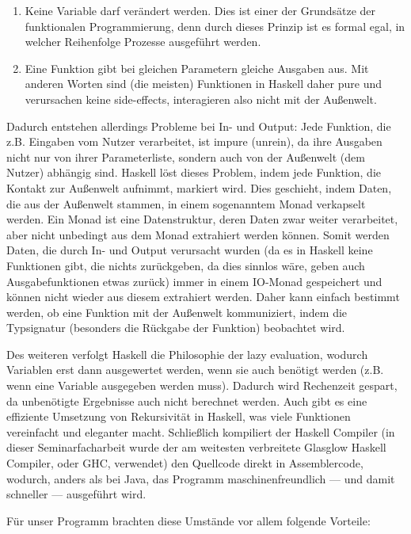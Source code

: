 \documentclass[twoside,a4paper,draft]{article}
\begin{document}
\begin{enumerate}
\item Keine Variable darf verändert werden. Dies ist einer der Grundsätze der funktionalen Programmierung, denn durch dieses Prinzip ist es formal egal, in welcher Reihenfolge Prozesse ausgeführt werden.
\item Eine Funktion gibt bei gleichen Parametern gleiche Ausgaben aus. Mit anderen Worten sind (die meisten) Funktionen in Haskell daher \glqq{}pure\grqq{} und verursachen keine \glqq{}side-effects\grqq{}, interagieren also nicht mit der Außenwelt.
\end{enumerate}

Dadurch entstehen allerdings Probleme bei In- und Output: Jede Funktion, die z.B. Eingaben vom Nutzer verarbeitet, ist \glqq{}impure\grqq{} (unrein), da ihre Ausgaben nicht nur von ihrer Parameterliste, sondern auch von der Außenwelt (dem Nutzer) abhängig sind. Haskell löst dieses Problem, indem jede Funktion, die Kontakt zur Außenwelt aufnimmt, markiert wird. Dies geschieht, indem Daten, die aus der Außenwelt stammen, in einem sogenanntem \glqq{}Monad\grqq{} verkapselt werden. Ein Monad ist eine Datenstruktur, deren Daten zwar weiter verarbeitet, aber nicht unbedingt aus dem Monad extrahiert werden können. Somit werden Daten, die durch In- und Output verursacht wurden (da es in Haskell keine Funktionen gibt, die nichts zurückgeben, da dies sinnlos wäre, geben auch Ausgabefunktionen etwas zurück) immer in einem \glqq{}IO-Monad\grqq{} gespeichert und können nicht wieder aus diesem extrahiert werden. Daher kann einfach bestimmt werden, ob eine Funktion mit der Außenwelt kommuniziert, indem die Typsignatur (besonders die Rückgabe der Funktion) beobachtet wird.

Des weiteren verfolgt Haskell die Philosophie der \glqq{}lazy evaluation\grqq{}, wodurch Variablen erst dann ausgewertet werden, wenn sie auch benötigt werden (z.B. wenn eine Variable ausgegeben werden muss). Dadurch wird Rechenzeit gespart, da unbenötigte Ergebnisse auch nicht berechnet werden. Auch gibt es eine effiziente Umsetzung von Rekursivität in Haskell, was viele Funktionen vereinfacht und eleganter macht. Schließlich kompiliert der Haskell Compiler (in dieser Seminarfacharbeit wurde der am weitesten verbreitete Glasglow Haskell Compiler, oder GHC, verwendet) den Quellcode direkt in Assemblercode, wodurch, anders als bei Java, das Programm maschinenfreundlich --- und damit schneller --- ausgeführt wird.

Für unser Programm brachten diese Umstände vor allem folgende Vorteile:
\end{document}
